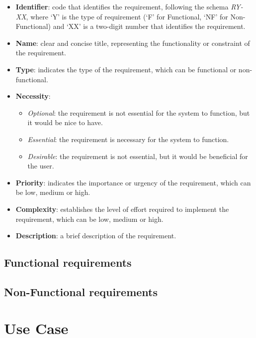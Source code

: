 \begin{itemize}
    \item \textbf{Identifier}: code that identifies the requirement, following the schema \textit{RY-XX}, where `Y' is the type of requirement (`F' for Functional, `NF' for Non-Functional) and `XX' is a two-digit number that identifies the requirement.
    \item \textbf{Name}: clear and concise title, representing the functionality or constraint of the requirement.
    \item \textbf{Type}: indicates the type of the requirement, which can be functional or non-functional.
    \item \textbf{Necessity}: 
        \begin{itemize}
            \item \textit{Optional}: the requirement is not essential for the system to function, but it would be nice to have.
            \item \textit{Essential}: the requirement is necessary for the system to function.
            \item \textit{Desirable}: the requirement is not essential, but it would be beneficial for the user.
        \end{itemize}
    \item \textbf{Priority}: indicates the importance or urgency of the requirement, which can be low, medium or high.
    \item \textbf{Complexity}: establishes the level of effort required to implement the requirement, which can be low, medium or high.
    \item \textbf{Description}: a brief description of the requirement.
\end{itemize}


\subsection{Functional requirements}



\subsection{Non-Functional requirements}



\section{Use Case}\label{sec:use-case}

